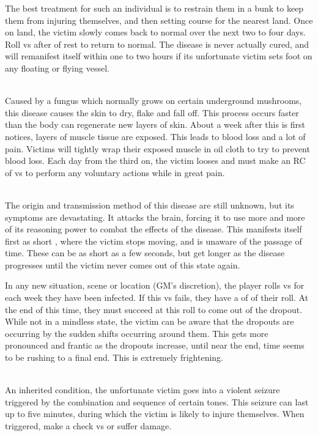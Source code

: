 \begin{multicols}{2}
The best treatment for such an individual is to restrain them in a bunk to keep them from injuring themselves, and then setting course for the nearest land. Once on land, the victim slowly comes back to normal over the next two to four days. Roll  vs \HEA after  of rest to return to normal. The disease is never actually cured, and will remanifest itself within one to two hours if its unfortunate victim sets foot on any floating or flying vessel.

\\
Caused by a fungus which normally grows on certain underground mushrooms, this disease causes the skin to dry, flake and fall off. This process occurs faster than the body can regenerate new layers of skin. About a week after this is first notices, layers of muscle tissue are exposed. This leads to blood loss and a lot of pain. Victims will tightly wrap their exposed muscle in oil cloth to try to prevent blood loss. Each day from the third on, the victim looses  \DP and must make an RC of  vs \WIL to perform any voluntary actions while in great pain.

\\
The origin and transmission method of this disease are still unknown, but its symptoms are devastating. It attacks the brain, forcing it to use more and more of its reasoning power to combat the effects of the disease. This manifests itself first as short , where the victim stops moving, and is unaware of the passage of time. These can be as short as a few seconds, but get longer as the disease progresses until the victim never comes out of this state again.

In any new situation, scene or location (GM's discretion), the player rolls  vs \WIL for each week they have been infected. If this \RC vs \WIL fails, they have a  of  of their roll.  At the end of this time, they must succeed at this roll to come out of the dropout. While not in a mindless state, the victim can be aware that the dropouts are occurring by the sudden shifts occurring around them. This gets more pronounced and frantic as the dropouts increase, until near the end, time seems to be rushing to a final end. This is extremely frightening.

\\
An inherited condition, the unfortunate victim goes into a violent seizure triggered by the combination and sequence of certain tones. This seizure can last up to five minutes, during which the victim is likely to injure themselves. When triggered, make a  check vs \HEA or suffer  \DP damage.


\end{multicols}
